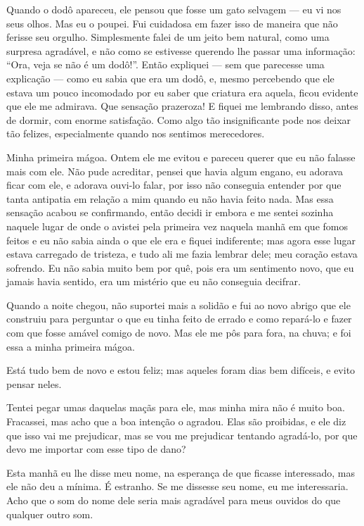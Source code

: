 Quando o dodô apareceu, ele pensou que fosse um gato selvagem --- eu vi nos seus
olhos. Mas eu o poupei. Fui cuidadosa em fazer isso de maneira que não
ferisse seu orgulho. Simplesmente falei de um jeito bem natural, como uma
surpresa agradável, e não como se estivesse querendo lhe passar uma informação:
“Ora, veja se não é um dodô!”. Então expliquei --- sem que parecesse uma
explicação --- como eu sabia que era um dodô, e, mesmo percebendo que ele estava um
pouco incomodado por eu saber que criatura era aquela, ficou evidente que ele
me admirava. Que sensação prazeroza! E fiquei me lembrando disso, antes de dormir, 
com enorme satisfação. Como algo tão insignificante pode
nos deixar tão felizes, especialmente quando nos sentimos merecedores.

 Minha primeira mágoa. Ontem ele me evitou e pareceu querer
que eu não falasse mais com ele. Não pude acreditar, pensei que havia
algum engano, eu adorava ficar com ele, e adorava ouvi-lo falar, por
isso não conseguia entender por que tanta antipatia em relação a mim
quando eu não havia feito nada. Mas essa sensação acabou se confirmando,
então decidi ir embora e me sentei sozinha naquele lugar de onde o avistei
pela primeira vez naquela manhã em que fomos feitos e eu não sabia ainda o que
ele era e fiquei indiferente; mas agora esse lugar estava carregado de tristeza, 
e tudo ali me fazia lembrar dele; meu coração estava sofrendo. Eu não sabia muito
bem por quê, pois era um sentimento novo, que eu jamais havia sentido,
era um mistério que eu não conseguia decifrar.

Quando a noite chegou, não suportei mais a solidão e fui ao novo abrigo
que ele construiu para perguntar o que eu tinha feito de errado e como repará-lo 
e fazer com que fosse amável comigo de novo. Mas ele me pôs
para fora, na chuva; e foi essa a minha primeira mágoa.

 Está tudo bem de novo e estou feliz; mas aqueles foram
dias bem difíceis, e evito pensar neles.

Tentei pegar umas daquelas maçãs para ele, mas minha mira não é muito boa.
Fracassei, mas acho que a boa intenção o agradou. Elas são proibidas, e ele diz
que isso vai me prejudicar, mas se vou me prejudicar tentando agradá-lo, por que 
devo me importar com esse tipo de dano?

 Esta manhã eu lhe disse meu nome, na esperança de que ficasse
interessado, mas ele não deu a mínima. É estranho. Se me dissesse seu nome,
eu me interessaria. Acho que o som do nome dele seria mais agradável para meus
ouvidos do que qualquer outro som.

